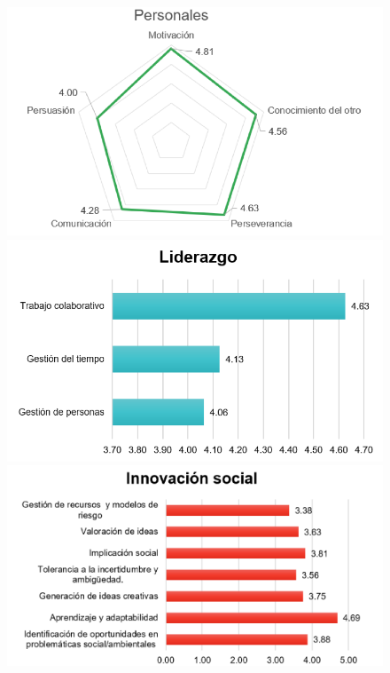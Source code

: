 \documentclass[spanish]{textolivre}
\begin{document}
\begin{figure}[htbp]
\centering
\begin{minipage}[t]{0.47\textwidth}
\includegraphics[width=\linewidth]{fig5-1 - 25716.png}
\subcaption{}
\end{minipage}
\hfill
\begin{minipage}[t]{0.47\textwidth}
\includegraphics[width=\linewidth]{fig5-2 - 25716.png}
\subcaption{}
\end{minipage}
\hfill
\begin{minipage}[t]{0.47\textwidth}
\includegraphics[width=\linewidth]{fig5-3 - 25716.png}

\end{minipage}
\end{figure}
\end{document}
